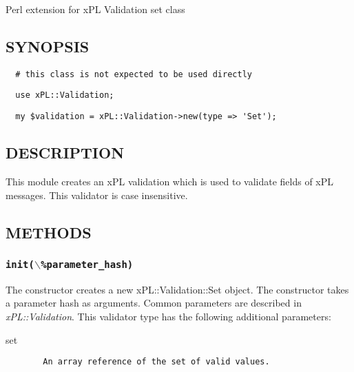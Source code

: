 \documentclass[12pt,a4paper]{article}
\begin{document}
Perl extension for xPL Validation set class

\subsection*{SYNOPSIS\label{xPL::Validation::Set_SYNOPSIS}}
\begin{verbatim}
  # this class is not expected to be used directly
\end{verbatim}
\begin{verbatim}
  use xPL::Validation;
\end{verbatim}
\begin{verbatim}
  my $validation = xPL::Validation->new(type => 'Set');
\end{verbatim}
\subsection*{DESCRIPTION\label{xPL::Validation::Set_DESCRIPTION}}


This module creates an xPL validation which is used to validate fields
of xPL messages.  This validator is case insensitive.

\subsection*{METHODS\label{xPL::Validation::Set_METHODS}}
\subsubsection*{\texttt{init($\backslash$\%parameter\_hash)}\label{xPL::Validation::Set_init_backslash_parameter_hash_}}


The constructor creates a new xPL::Validation::Set object.
The constructor takes a parameter hash as arguments.  Common
parameters are described in \emph{xPL::Validation}.  This validator type
has the following additional parameters:

\begin{description}

\item[{set}] \mbox{}\begin{verbatim}
  An array reference of the set of valid values.
\end{verbatim}
\end{description}
\end{document}
